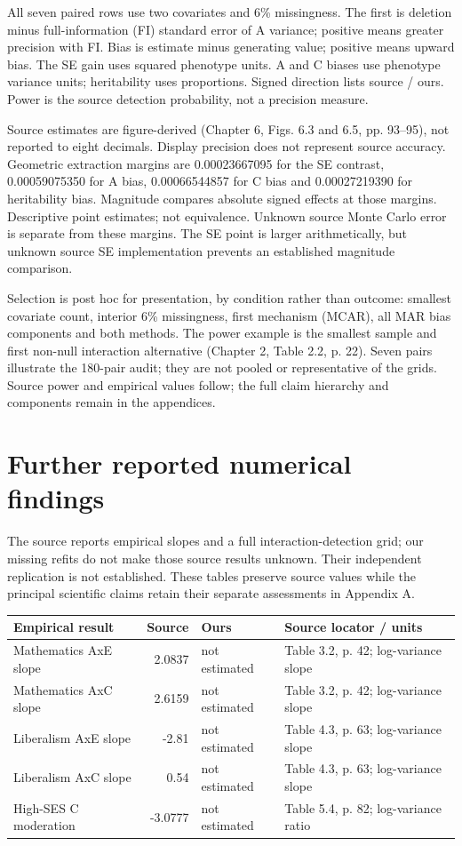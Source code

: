 \documentclass[11pt]{article}
\renewcommand{\arraystretch}{1.25}
\begin{document}
\vspace{3pt}
{\small All seven paired rows use two covariates and 6\% missingness. The first is deletion minus full-information (FI) standard error of A variance; positive means greater precision with FI. Bias is estimate minus generating value; positive means upward bias. The SE gain uses squared phenotype units. A and C biases use phenotype variance units; heritability uses proportions. Signed direction lists source / ours. Power is the source detection probability, not a precision measure.

Source estimates are figure-derived (Chapter 6, Figs. 6.3 and 6.5, pp. 93--95), not reported to eight decimals. Display precision does not represent source accuracy. Geometric extraction margins are 0.00023667095 for the SE contrast, 0.00059075350 for A bias, 0.00066544857 for C bias and 0.00027219390 for heritability bias. Magnitude compares absolute signed effects at those margins. Descriptive point estimates; not equivalence. Unknown source Monte Carlo error is separate from these margins. The SE point is larger arithmetically, but unknown source SE implementation prevents an established magnitude comparison.

Selection is post hoc for presentation, by condition rather than outcome: smallest covariate count, interior 6\% missingness, first mechanism (MCAR), all MAR bias components and both methods. The power example is the smallest sample and first non-null interaction alternative (Chapter 2, Table 2.2, p. 22). Seven pairs illustrate the 180-pair audit; they are not pooled or representative of the grids. Source power and empirical values follow; the full claim hierarchy and components remain in the appendices.}

\newpage
\section*{Further reported numerical findings}
The source reports empirical slopes and a full interaction-detection grid; our missing refits do not make those source results unknown. Their independent replication is not established. These tables preserve source values while the principal scientific claims retain their separate assessments in Appendix A.
{\small\setlength{\tabcolsep}{5pt}\renewcommand{\arraystretch}{1.3}
\begin{tabular}{@{}p{155pt}rp{85pt}p{125pt}@{}}\toprule
Empirical result & Source & Ours & Source locator / units\\\midrule
Mathematics AxE slope & 2.0837 & not estimated & Table 3.2, p. 42; log-variance slope\\
Mathematics AxC slope & 2.6159 & not estimated & Table 3.2, p. 42; log-variance slope\\
Liberalism AxE slope & -2.81 & not estimated & Table 4.3, p. 63; log-variance slope\\
Liberalism AxC slope & 0.54 & not estimated & Table 4.3, p. 63; log-variance slope\\
High-SES C moderation & -3.0777 & not estimated & Table 5.4, p. 82; log-variance ratio\\\bottomrule
\end{tabular}}
\end{document}
